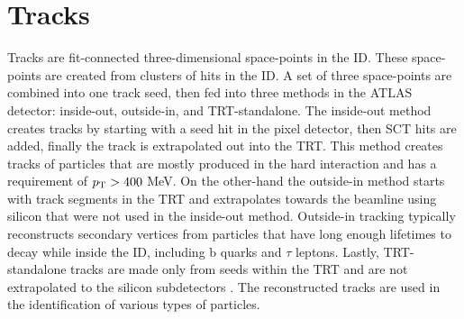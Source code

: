 	\section{Tracks}
		Tracks are fit-connected three-dimensional space-points in the \gls{ID}. These space-points are created from clusters of hits in the \gls{ID}. A set of three space-points are combined into one track seed, then fed into three methods in the \gls{ATLAS} detector: inside-out,  outside-in, and \gls{TRT}-standalone. The inside-out method creates tracks by starting with a seed hit in the pixel detector, then \gls{SCT} hits are added, finally the track is extrapolated out into the TRT. This method creates tracks of particles that are mostly produced in the hard \pp interaction and has a requirement of $p_{\text{T}}>400$ MeV. On the other-hand the outside-in method starts with track segments in the \gls{TRT} and extrapolates towards the beamline using silicon that were not used in the inside-out method. Outside-in tracking typically reconstructs secondary vertices from particles that have long enough lifetimes to decay while inside the \gls{ID}, including b quarks and $\tau$ leptons. Lastly, \gls{TRT}-standalone tracks are made only from seeds within the \gls{TRT} and are not extrapolated to the silicon subdetectors \cite{ATLAS-perf-run2}. The reconstructed tracks are used in the identification of various types of particles.


